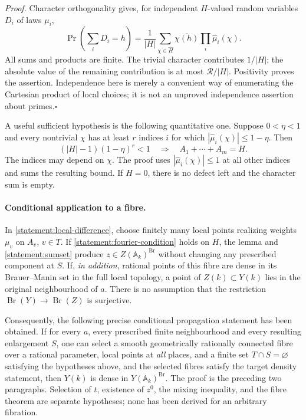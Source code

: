 \documentclass[11pt]{article}
\newcommand{\A}{\mathbb{A}}
\begin{document}
\emph{Proof.}
Character orthogonality gives, for independent $H$-valued random variables
$D_i$ of laws $\mu_i$,
\[
 \Pr\left(\sum_iD_i=h\right)
 =\frac1{|H|}\sum_{\chi\in\widehat H}
       \overline{\chi(h)}\prod_i\widehat\mu_i(\chi).
\]
All sums and products are finite.  The trivial character contributes $1/|H|$;
the absolute value of the remaining contribution is at most
$\mathcal R/|H|$.  Positivity proves the assertion.  Independence here is
merely a convenient way of enumerating the Cartesian product of local choices;
it is not an unproved independence assertion about primes.\hfill$\square$

A useful sufficient hypothesis is the following quantitative one.  Suppose
$0<\eta<1$ and every nontrivial $\chi$ has at least $r$ indices $i$ for which
$|\widehat\mu_i(\chi)|\le1-\eta$.  Then
\begin{equation}\label{statement:quantitative}
 (|H|-1)(1-\eta)^r<1
 \quad\Longrightarrow\quad A_1+\cdots+A_m=H.
\end{equation}
The indices may depend on $\chi$.  The proof uses
$|\widehat\mu_i(\chi)|\le1$ at all other indices and sums the resulting bound.
If $H=0$, there is no defect left and the character sum is empty.

\paragraph{Conditional application to a fibre.}
In \eqref{statement:local-difference}, choose finitely many local points realizing
weights $\mu_v$ on $A_v$, $v\in T$.  If
\eqref{statement:fourier-condition} holds on $H$, the lemma and
\eqref{statement:sumset} produce $z\in Z(\A_k)^{\operatorname{Br}}$ without changing
any prescribed component at $S$.  If, \emph{in addition}, rational points of
this fibre are dense in its Brauer--Manin set in the full local topology, a
point of $Z(k)\subset Y(k)$ lies in the original neighbourhood of $a$.
There is no assumption that the restriction $\operatorname{Br}(Y)\to
\operatorname{Br}(Z)$ is surjective.

Consequently, the following precise conditional propagation statement has
been obtained.  If for every $a$, every prescribed finite neighbourhood and
every resulting enlargement $S$, one can select a smooth geometrically
rationally connected fibre over a rational parameter, local points at \emph{all} places, and a finite set $T\cap S=\varnothing$
satisfying the hypotheses above, and the selected fibres satisfy the target
density statement, then $Y(k)$ is dense in $Y(\A_k)^{\operatorname{Br}}$.
The proof is the preceding two paragraphs.  Selection of $t$, existence of
$z^0$, the mixing inequality, and the fibre theorem are separate hypotheses;
none has been derived for an arbitrary fibration.
\end{document}

